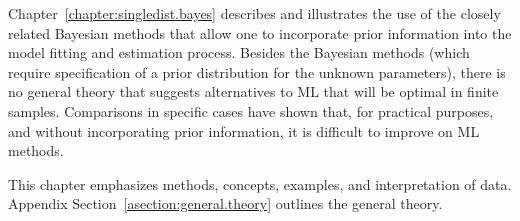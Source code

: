 Chapter~\ref{chapter:singledist.bayes} 
describes and illustrates the use of the closely related Bayesian
methods that allow one to incorporate prior information into the
model fitting and estimation process. Besides the Bayesian methods
(which require specification of a prior distribution for the unknown
parameters), there is no general theory that suggests alternatives to
ML that will be optimal in finite samples. Comparisons in specific
cases have shown that, for practical purposes, and without
incorporating prior information, it is difficult to improve on ML
methods.


This chapter emphasizes methods, concepts, examples, and
interpretation of data.  Appendix Section~\ref{asection:general.theory}
outlines the general theory.

